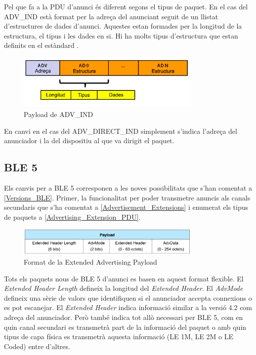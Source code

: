 Pel que fa a la PDU d'anunci és diferent segons el tipus de paquet.
En el cas del ADV\_IND està format per la adreça del anunciant seguit de un llistat d'estructures de dades d'anunci.
Aquestes estan formades per la longitud de la estructura, el tipus i les dades en si.
Hi ha molts tipus d'estructura que estan definits en el estàndard \cite{AD_Types}.

\begin{figure}[!h]
	\begin{center}
		\includegraphics[width=0.8\textwidth]{./images/adv-ind-packet.png}
		\caption{Payload de ADV\_IND}
	\end{center}
\end{figure}

En canvi en el cas del ADV\_DIRECT\_IND simplement s'indica l'adreça del anunciador i la del dispositiu al que va dirigit el paquet.

\subsection{BLE 5}
Els canvis per a BLE 5 corresponen a les noves possibilitats que s'han comentat a \ref{Versions_BLE}.
Primer, la funcionalitat per poder transmetre anuncis als canals secundaris que s'ha comentat a \ref{Advertisement_Extensions} i enumerat els tipus de paquets a \ref{Advertising_Extension_PDU}.

\begin{figure}[!h]
	\begin{center}
		\includegraphics[width=0.8\textwidth]{./images/Common_Extended_Advertising_Payload_Format.png}
		\caption{Format de la Extended Advertising Payload \cite{BLE_5_Extended_Advertising}}
	\end{center}
\end{figure}

Tots els paquets nous de BLE 5 d'anunci es basen en aquest format flexible.
El \textit{Extended Header Length} defineix la longitud del \textit{Extended Header}.
El \textit{AdvMode} defineix una sèrie de valors que identifiquen si el anunciador accepta connexions o es pot escanejar.
El \textit{Extended Header} indica informació similar a la versió 4.2 com adreça del anunciador.
Però també indica tot allò necessari per BLE 5, com en quin canal secundari es transmetrà part de la informació del paquet o amb quin tipus de capa física es transmetrà aquesta informació (LE 1M, LE 2M o LE Coded) entre d'altres.
